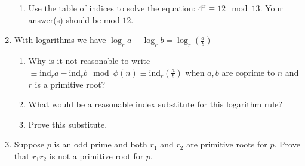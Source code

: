 \documentclass[class=article, crop=false]{standalone}
\def\ind{{\text{ind}}}
\begin{document}
\begin{enumerate}
\begin{enumerate}
  \item
	Use the table of indices to solve the equation:
	$4^x\equiv 12 \mod 13$.
	Your answer(s) should be mod $12$.

  \end{enumerate}

\item
  With logarithms we have
  $\log_r a-\log_r b=\log_r\left(\frac ab\right)$
  \begin{enumerate}
  \item
	Why is it not reasonable to write
	$\equiv \ind_r a-\ind_r b\mod \phi(n) \equiv \ind_r\left(\frac ab\right)$
	when $a,b$ are coprime to $n$ and $r$ is a primitive root?

  \item
	What would be a reasonable index substitute for this logarithm rule?

  \item
	Prove this substitute.

  \end{enumerate}

\item
  Suppose $p$ is an odd prime and both $r_1$ and $r_2$
  are primitive roots for $p$.
  Prove that $r_1r_2$ is not a primitive root for $p$.

\end{enumerate}
\end{document}
